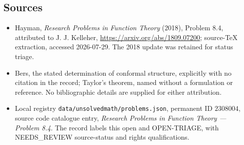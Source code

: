 \documentclass[11pt]{article}
\begin{document}
\subsection{Sources}
\begin{itemize}
\item Hayman, \emph{Research Problems in Function Theory} (2018), Problem 8.4, attributed to J. J. Kelleher, \url{https://arxiv.org/abs/1809.07200}; source-TeX extraction, accessed 2026-07-29. The 2018 update was retained for status triage.
\item Bers, the stated determination of conformal structure, explicitly with no citation in the record; Taylor's theorem, named without a formulation or reference. No bibliographic details are supplied for either attribution.
\item Local registry \texttt{data/unsolvedmath/problems.json}, permanent ID $2308004$, source code catalogue entry, \emph{Research Problems in Function Theory --- Problem 8.4}. The record labels this open and OPEN-TRIAGE, with NEEDS\_REVIEW source-status and rights qualifications.
\end{itemize}
\end{document}
